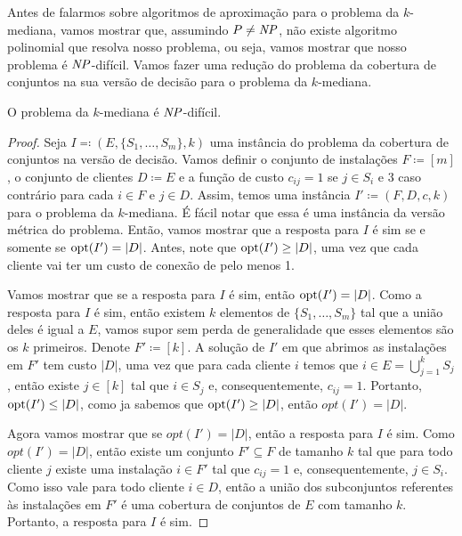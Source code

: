 Antes de falarmos sobre algoritmos de aproximação para o problema da $k$-mediana, vamos mostrar que, assumindo $P \neq \mathit{NP}$, não existe algoritmo polinomial que resolva nosso problema, ou seja, vamos mostrar que nosso problema é $\mathit{NP}$-difícil. Vamos fazer uma redução do problema da cobertura de conjuntos na sua versão de decisão para o problema da $k$-mediana.

\begin{theorem}
O problema da $k$-mediana é $\mathit{NP}$-difícil.
\end{theorem}
\begin{proof}
Seja $I \eqqcolon (E,\{S_1,\ldots,S_m\},k)$ uma instância do problema da cobertura de conjuntos na versão de decisão. Vamos definir o conjunto de instalações $F \coloneqq [m]$, o conjunto de clientes $D \coloneqq E$ e a função de custo $c_{ij} = 1$ se $j \in S_i$ e 3 caso contrário para cada $i \in F$ e $j \in D$. Assim, temos uma instância $I' \coloneqq (F,D,c,k)$ para o problema da $k$-mediana. É fácil notar que essa é uma instância da versão métrica do problema. Então, vamos mostrar que a resposta para $I$ é sim se e somente se $\mathrm{opt}(I') = |D|$. Antes, note que $\mathrm{opt}(I') \geq |D|$, uma vez que cada cliente vai ter um custo de conexão de pelo menos 1.

Vamos mostrar que se a resposta para $I$ é sim, então $\mathrm{opt}(I') = |D|$. Como a resposta para $I$ é sim, então existem $k$ elementos de $\{S_1,\ldots,S_m\}$ tal que a união deles é igual a $E$, vamos supor sem perda de generalidade que esses elementos são os $k$ primeiros. Denote $F' \coloneqq [k]$. A solução de $I'$ em que abrimos as instalações em $F'$ tem custo $|D|$, uma vez que para cada cliente $i$ temos que $i \in E = \bigcup_{j= 1}^k S_j$, então existe $j \in [k]$ tal que $i \in S_j$ e, consequentemente, $c_{ij} = 1$. Portanto, $\mathrm{opt}(I') \leq |D|$, como ja sabemos que $\mathrm{opt}(I') \geq |D|$, então $opt(I') = |D|$.

Agora vamos mostrar que se $opt(I') = |D|$, então a resposta para $I$ é sim. Como $opt(I') = |D|$, então existe um conjunto $F' \subseteq F$ de tamanho $k$ tal que para todo cliente $j$ existe uma instalação $i \in F'$ tal que $c_{ij} = 1$ e, consequentemente, $j \in S_i$. Como isso vale para todo cliente $i \in D$, então a união dos subconjuntos referentes às instalações em $F'$ é uma cobertura de conjuntos de $E$ com tamanho $k$. Portanto, a resposta para $I$ é sim.
\end{proof}